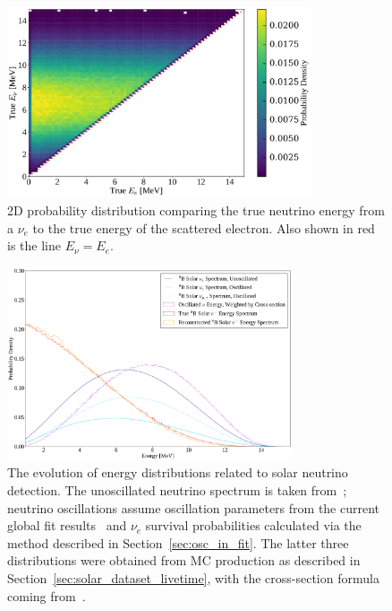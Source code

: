 \begin{figure}
    \centering
    \includegraphics[width=0.8\textwidth]{6_SolarAnalysis/images/b8_eelectrue_vs_enutrue.pdf}
    \caption[True \beight{} $E_{\nu}$ versus true $E_{e}$.]{2D probability distribution comparing the true neutrino energy from a \beight{} $\nu_{e}$ to the true energy of the scattered electron. Also shown in red is the line $E_{\nu} = E_{e}$.}
    \label{fig:nu_elec_energy_dependence}
\end{figure}

\begin{figure}
    \centering
    \includegraphics[width=0.75\textwidth]{6_SolarAnalysis/images/b8_energy_evolution.pdf}
    \caption[The evolution of energy distributions related to \beight{} solar neutrino detection.]{The evolution of energy distributions related to \beight{} solar neutrino detection. The unoscillated neutrino spectrum is taken from~\cite{winterB8NeutrinoSpectrum2006}; %
    neutrino oscillations assume oscillation parameters from the current global fit results~\cite{estebanFateHintsUpdated2020} %
    and $\nu_{e}$ survival probabilities calculated via the method described in Section~\ref{sec:osc_in_fit}. The latter three distributions were obtained from MC production as described in Section~\ref{sec:solar_dataset_livetime}, with the cross-section formula coming from~\cite{bahcallSolarNeutrinosRadiative1995}.%
    }
    \label{fig:nu_elec_energy_dependence2}
\end{figure}

